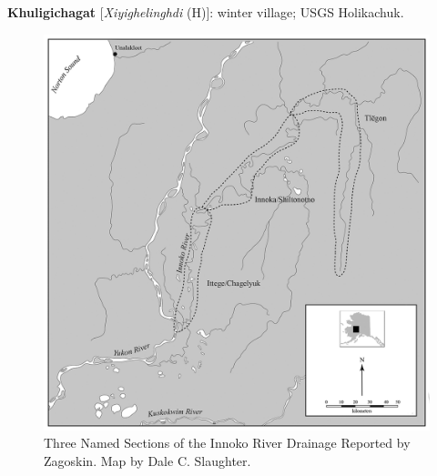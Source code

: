 \begin{hang}
\textbf{Khuligichagat} [\textit{Xiyighelinghdi} (H)]: winter village; USGS Holikachuk.

\end{hang}

\begin{figure}[ht]
    \centering
    \includegraphics[width=\textwidth]{figures/pratt-fig4.png}
    \caption{Three Named Sections of the Innoko River Drainage Reported by Zagoskin. Map by Dale C. Slaughter.}
    \label{pratt-fig4}
\end{figure}

